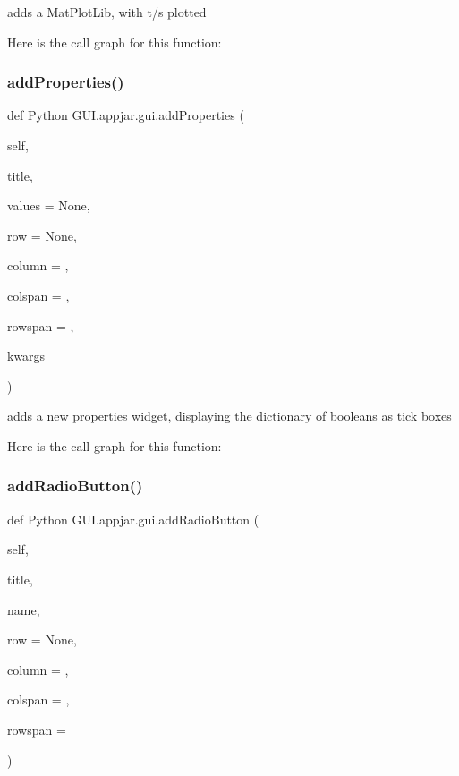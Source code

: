 \begin{DoxyVerb}adds a MatPlotLib, with t/s plotted \end{DoxyVerb}
 Here is the call graph for this function\+:
\mbox{\label{class_python_01_g_u_i_1_1appjar_1_1gui_a25547332eaf669ac5351b453accc1ae2}} 
\subsubsection{\texorpdfstring{add\+Properties()}{addProperties()}}
{\footnotesize\ttfamily def Python G\+U\+I.\+appjar.\+gui.\+add\+Properties (\begin{DoxyParamCaption}\item[{}]{self,  }\item[{}]{title,  }\item[{}]{values = {\ttfamily None},  }\item[{}]{row = {\ttfamily None},  }\item[{}]{column = {},  }\item[{}]{colspan = {},  }\item[{}]{rowspan = {},  }\item[{}]{kwargs }\end{DoxyParamCaption})}

\begin{DoxyVerb}adds a new properties widget, displaying the dictionary of booleans as tick boxes \end{DoxyVerb}
 Here is the call graph for this function\+:
\mbox{\label{class_python_01_g_u_i_1_1appjar_1_1gui_a3020da53937c4a65832c8cb88df01727}} 
\subsubsection{\texorpdfstring{add\+Radio\+Button()}{addRadioButton()}}
{\footnotesize\ttfamily def Python G\+U\+I.\+appjar.\+gui.\+add\+Radio\+Button (\begin{DoxyParamCaption}\item[{}]{self,  }\item[{}]{title,  }\item[{}]{name,  }\item[{}]{row = {\ttfamily None},  }\item[{}]{column = {},  }\item[{}]{colspan = {},  }\item[{}]{rowspan = {} }\end{DoxyParamCaption})}

